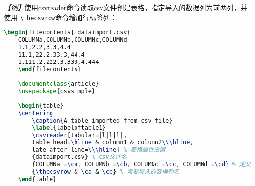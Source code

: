 \emph{【例】}使用csvreader命令读取csv文件创建表格，指定导入的数据列为前两列，并使用
\texttt{\textbackslash{}thecsvrow}命令增加行标签列：
\begin{lstlisting}[language=TeX]
    \begin{filecontents}{dataimport.csv}
    COLUMNa,COLUMNb,COLUMNc,COLUMNd
    1.1,2.2,3.3,4.4
    11.1,22.2,33.3,44.4
    1.111,2.222,3.333,4.444
    \end{filecontents}
    
    \documentclass{article}
    \usepackage{csvsimple}
    
    \begin{table}
    \centering
        \caption{A table imported from csv file}
        \label{labeloftable1}
        \csvreader[tabular=|l|l|l|,
        table head=\hline & column1 & column2\\\hline,
        late after line=\\\hline] % 表格属性设置
        {dataimport.csv} % csv文件名
        {COLUMNa =\ca, COLUMNb =\cb, COLUMNc =\cc, COLUMNd =\cd} % 定义数据列名
        {\thecsvrow & \ca & \cb} % 需要导入的数据列名
    \end{table}
    
\end{lstlisting}